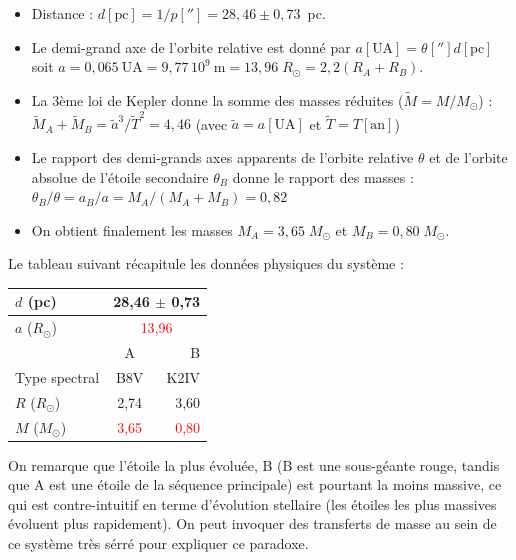 \documentclass[a4paper,10pt]{report}
\newcommand{\e}[1]{\ensuremath{\, 10^{#1}}}
\newcommand{\UA}{\ensuremath{\textrm{UA}}}
\renewcommand{\u}[1]{\ensuremath{\mathrm{#1}}} %
\newcommand{\red}[1]{\textcolor{red}{#1}}
\begin{document}
\begin{Answer}
  \begin{itemize}
  \item Distance : $d [\u{pc}] = 1/p[''] = 28,46 \pm 0,73$~pc.
  \item Le demi-grand axe de l'orbite relative est donné par $a [\UA]
    = \theta [''] d [\u{pc}]$ soit $a = 0,065~\UA = 9,77\e{9}~\u{m} =
    13,96\;R_{\odot} = 2,2 (R_{A}+R_{B})$.
  \item La 3ème loi de Kepler donne la somme des masses réduites
    ($\tilde{M} = M/M_{\odot}$) : $\tilde{M}_A + \tilde{M}_B =
    \tilde{a}^3/\tilde{T}^2 = 4,46$ (avec $\tilde{a} = a[\UA]$ et
    $\tilde{T} = T[\u{an}]$)
  \item Le rapport des demi-grands axes apparents de l'orbite relative
    $\theta$ et de l'orbite absolue de l'étoile secondaire $\theta_B$
    donne le rapport des masses : $\theta_B / \theta = a_B / a = M_A /
    (M_A + M_B) = 0,82$
  \item On obtient finalement les masses $M_A = 3,65\;M_{\odot}$ et $M_B =
    0,80\;M_{\odot}$.
  \end{itemize}

  Le tableau suivant récapitule les données physiques du système :
  \begin{center}
    \begin{tabular}{|l|c|r|}
      \hline
      $d$ (pc) & \multicolumn{2}{c|}{28,46 $\pm$ 0,73} \\
      \hline
      $a$ ($R_{\odot}$) &  \multicolumn{2}{c|}{\red{13,96}} \\
      \hline
      & A & B \\
      \cline{1-3}
      Type spectral & B8V & K2IV \\
      \hline
      $R$ ($R_{\odot}$) & 2,74 & 3,60 \\
      \hline
      $M$ ($M_{\odot}$) & \red{3,65} & \red{0,80} \\
      \hline
    \end{tabular}
  \end{center}
  On remarque que l'étoile la plus évoluée, B (B est une sous-géante
  rouge, tandis que A est une étoile de la séquence principale) est
  pourtant la moins massive, ce qui est contre-intuitif en terme
  d'évolution stellaire (les étoiles les plus massives évoluent plus
  rapidement). On peut invoquer des transferts de masse au sein de ce
  système très sérré pour expliquer ce paradoxe.
\end{Answer}
\end{document}
